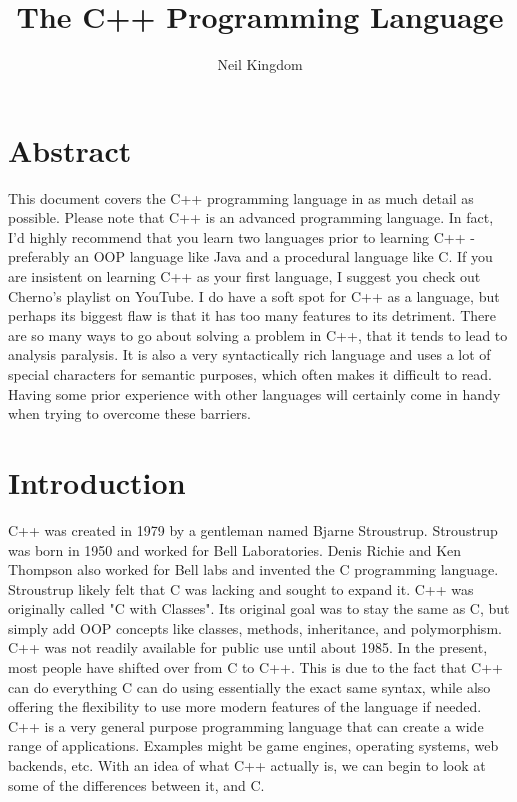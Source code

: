 \documentclass{article}
\title{The C++ Programming Language}
\author{Neil Kingdom}
\begin{document}
\begin{titlingpage}

\maketitle

\end{titlingpage}

\newpage

\tableofcontents

\newpage

\section{Abstract}

This document covers the C++ programming language in as much detail as possible. Please note that C++ is an
advanced programming language. In fact, I’d highly recommend that you learn two languages prior to learning
C++ - preferably an OOP language like Java and a procedural language like C. If you are insistent on learning
C++ as your first language, I suggest you check out Cherno's playlist on YouTube. I do have a soft spot for
C++ as a language, but perhaps its biggest flaw is that it has too many features to its detriment. There are so
many ways to go about solving a problem in C++, that it tends to lead to analysis paralysis. It is also a very
syntactically rich language and uses a lot of special characters for semantic purposes, which often makes it
difficult to read. Having some prior experience with other languages will certainly come in handy when trying
to overcome these barriers.

\section{Introduction}

C++ was created in 1979 by a gentleman named Bjarne Stroustrup. Stroustrup was born in 1950 and worked for
Bell Laboratories. Denis Richie and Ken Thompson also worked for Bell labs and invented the C programming
language. Stroustrup likely felt that C was lacking and sought to expand it. C++ was originally called "C with
Classes". Its original goal was to stay the same as C, but simply add OOP concepts like classes, methods,
inheritance, and polymorphism. C++ was not readily available for public use until about 1985. In the present,
most people have shifted over from C to C++. This is due to the fact that C++ can do everything C can do using
essentially the exact same syntax, while also offering the flexibility to use more modern features of the
language if needed. C++ is a very general purpose programming language that can create a wide range of
applications. Examples might be game engines, operating systems, web backends, etc. With an idea of what C++
actually is, we can begin to look at some of the differences between it, and C.
\end{document}

